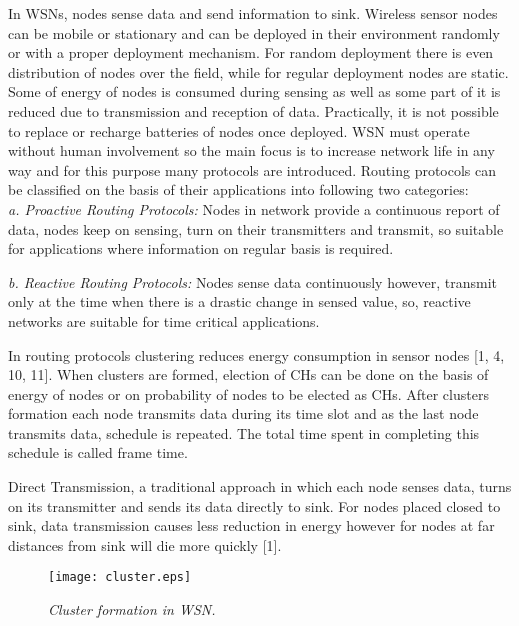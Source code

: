\documentclass[conference]{IEEEtran}
\begin{document}
In WSNs, nodes sense data and send information to sink. Wireless sensor nodes can be mobile or stationary and can be deployed in their environment randomly or with a proper deployment mechanism. For random deployment there is even distribution of nodes over the field, while for regular deployment nodes are static. Some of energy of nodes is consumed during sensing as well as some part of it is reduced due to transmission and reception of data. Practically, it is not possible to replace or recharge batteries of nodes once deployed. WSN must operate without human involvement so the main focus is to increase network life in any way and for this purpose many protocols are introduced. Routing protocols can be classified on the basis of their applications into following two categories:\\

\textit{a. Proactive Routing Protocols:}
Nodes in network provide a continuous report of data, nodes keep on sensing, turn on their transmitters and transmit, so suitable for applications where information on regular basis is required.

\textit{b. Reactive Routing Protocols:}
Nodes sense data continuously however, transmit only at the time when there is a drastic change in sensed value, so, reactive networks are suitable for time critical applications.


In routing protocols clustering reduces energy consumption in sensor nodes [1, 4, 10, 11]. When clusters are formed, election of CHs can be done on the basis of energy of nodes or on probability of nodes to be elected as CHs. After clusters formation each node transmits data during its time slot and as the last node transmits data, schedule is repeated. The total time spent in completing this schedule is called frame time.

Direct Transmission, a traditional approach in which each node senses data, turns on its transmitter and sends its data directly to sink. For nodes placed closed to sink, data transmission causes less reduction in energy however for nodes at far distances from sink will die more quickly [1].


\begin{figure}
\begin{center}
\texttt{[image: cluster.eps]}
\caption{\small \sl Cluster formation in WSN.\label{fig:Stupendous}}
\end{center}
\end{figure}
\end{document}
